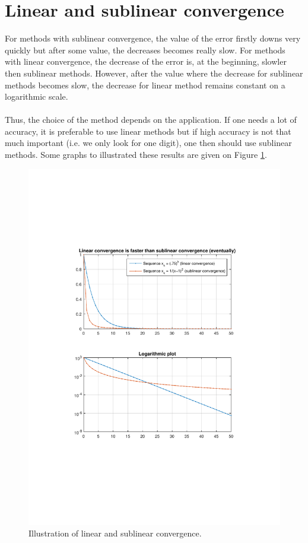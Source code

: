 \section{Linear and sublinear convergence}
 For methods with sublinear convergence, the value of the error firstly downs very quickly but after some value, the decreases becomes really slow. For methods with linear convergence, the decrease of the error is, at the beginning, slowler then sublinear methods. However, after the value where the decrease for sublinear methods becomes slow, the decrease for linear method remains constant on a logarithmic scale. \\ \\ Thus, the choice of the method depends on the application. If one needs a lot of accuracy, it is preferable to use linear methods but if high accuracy is not that much important (i.e. we only look for one digit), one then should use sublinear methods. Some graphs to illustrated these results are given on Figure \ref{fig:linear_convergence}.

\begin{figure}
\centering
\includegraphics[width=\linewidth]{images/L6-Linear_convergence.pdf} 
\caption{Illustration of linear and sublinear convergence.}
\label{fig:linear_convergence}
\end{figure}


